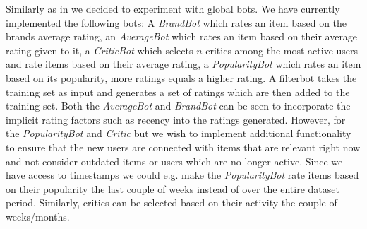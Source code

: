 Similarly as in \cite{Park2006} we decided to experiment with global bots. We have currently implemented the following bots: A \emph{BrandBot} which rates an item based on the brands average rating, an \emph{AverageBot} which rates an item based on their average rating given to it, a \emph{CriticBot} which selects $n$ critics among the most active users and rate items based on their average rating, a \emph{PopularityBot} which rates an item based on its popularity, more ratings equals a higher rating. A filterbot takes the training set as input and generates a set of ratings which are then added to the training set. Both the \emph{AverageBot} and \emph{BrandBot} can be seen to incorporate the implicit rating factors such as recency into the ratings generated. However, for the \emph{PopularityBot} and \emph{Critic} but we wish to implement additional functionality to ensure that the new users are connected with items that are relevant right now and not consider outdated items or users which are no longer active. Since we have access to timestamps we could e.g. make the \emph{PopularityBot} rate items based on their popularity the last couple of weeks instead of over the entire dataset period. Similarly, critics can be selected based on their activity the couple of weeks/months.


